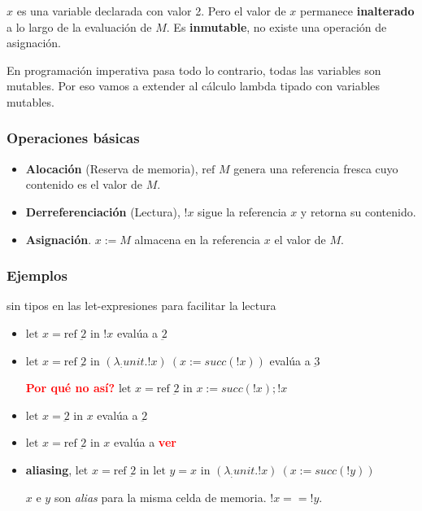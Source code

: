 \documentclass{report}
\theoremstyle{definition} %
\newcommand{\todo}[1]{{\textcolor{red}{\textbf{#1}}}}
\newcommand{\abs}[3]{\lambda #1 : #2 . #3}
\newcommand{\app}[2]{#1 \ #2} %
\newcommand{\suc}[1]{succ(#1)}
\newcommand{\num}[1]{\underbar{#1}} %
\newcommand{\seq}[2]{#1;#2}
\newcommand{\uletin}[3]{\text{let } #1 = #2 \text{ in } #3} %
\newcommand{\alloc}[1]{\text{ref } #1}
\newcommand{\dealloc}[1]{!#1}
\newcommand{\assign}[2]{#1 := #2}
\begin{document}
$x$ es una variable declarada con valor 2. Pero el valor de $x$ permanece
\textbf{inalterado} a lo largo de la evaluación de $M$. Es \textbf{inmutable},
no existe una operación de asignación.

En programación imperativa pasa todo lo contrario, todas las variables son
mutables. Por eso vamos a extender al cálculo lambda tipado con variables
mutables.

\subsubsection{Operaciones básicas}

\begin{itemize}
    \item \textbf{Alocación} (Reserva de memoria), $\alloc{M}$ genera una
    referencia fresca cuyo contenido es el valor de $M$.
    \item \textbf{Derreferenciación} (Lectura), $\dealloc{x}$ sigue la
    referencia $x$ y retorna su contenido.
    \item \textbf{Asignación}. $\assign{x}{M}$ almacena en la referencia $x$ el
    valor de $M$.
\end{itemize}

\subsubsection{Ejemplos}

sin tipos en las let-expresiones para facilitar la lectura

\begin{itemize}
    \item $\uletin{x}{\alloc{\num{2}}}{\dealloc{x}}$ evalúa a  $\num{2}$
    \item \(
        \uletin
            {x}
            {\alloc{\num{2}}}
            {\app
                {(\abs{_}{unit}{\dealloc{x}})}
                {(\assign{x}{\suc{\dealloc{x}}})}
            }
    \) evalúa a $\num{3}$

    \todo{Por qué no así?} \( %
        \uletin
            {x}
            {\alloc{\num{2}}}
            {\seq
                {\assign{x}{\suc{\dealloc{x}}}}
                {\dealloc{x}}
            }
    \)
    
    \item $\uletin{x}{\num{2}}{x}$ evalúa a $\num{2}$
    \item $\uletin{x}{\alloc{\num{2}}}{x}$ evalúa a \todo{ver}
    \item \textbf{aliasing},  \(
        \uletin
            {x}
            {\alloc{\num{2}}}
            {
                \uletin{y}{x}
                {
                    \app
                        {(\abs{_}{unit}{\dealloc{x}})}
                        {(\assign{x}{\suc{\dealloc{y}}})}
                }
            }
    \)

    $x$ e $y$ son \textit{alias} para la misma celda de memoria. $\dealloc{x} == 
    \dealloc{y}$.
\end{itemize}
\end{document}
